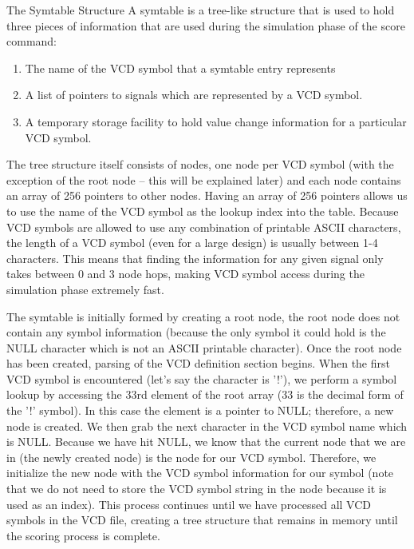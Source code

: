 \begin{Desc}
\item[The Symtable Structure]A symtable is a tree-like structure that is used to hold three pieces of information that are used during the simulation phase of the score command:\end{Desc}
\begin{Desc}
\item[]\begin{enumerate}
\item The name of the VCD symbol that a symtable entry represents\item A list of pointers to signals which are represented by a VCD symbol.\item A temporary storage facility to hold value change information for a particular VCD symbol.\end{enumerate}
\end{Desc}
\begin{Desc}
\item[]The tree structure itself consists of nodes, one node per VCD symbol (with the exception of the root node -- this will be explained later) and each node contains an array of 256 pointers to other nodes. Having an array of 256 pointers allows us to use the name of the VCD symbol as the lookup index into the table. Because VCD symbols are allowed to use any combination of printable ASCII characters, the length of a VCD symbol (even for a large design) is usually between 1-4 characters. This means that finding the information for any given signal only takes between 0 and 3 node hops, making VCD symbol access during the simulation phase extremely fast.\end{Desc}
\begin{Desc}
\item[]The symtable is initially formed by creating a root node, the root node does not contain any symbol information (because the only symbol it could hold is the NULL character which is not an ASCII printable character). Once the root node has been created, parsing of the VCD definition section begins. When the first VCD symbol is encountered (let's say the character is '!'), we perform a symbol lookup by accessing the 33rd element of the root array (33 is the decimal form of the '!' symbol). In this case the element is a pointer to NULL; therefore, a new node is created. We then grab the next character in the VCD symbol name which is NULL. Because we have hit NULL, we know that the current node that we are in (the newly created node) is the node for our VCD symbol. Therefore, we initialize the new node with the VCD symbol information for our symbol (note that we do not need to store the VCD symbol string in the node because it is used as an index). This process continues until we have processed all VCD symbols in the VCD file, creating a tree structure that remains in memory until the scoring process is complete.\end{Desc}
